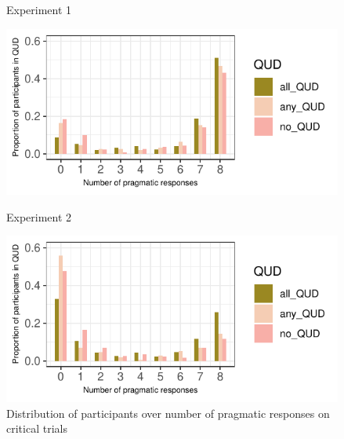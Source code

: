 \documentclass[12pt]{article}
\begin{document}
\begin{figure}[!ht] 
    \begin{minipage}{.5\textwidth}
    \caption*{Experiment 1}
    \includegraphics[height=5.6cm]{img/exp1_pragmatic_proportion.pdf}
    \end{minipage}%
    \begin{minipage}{.5\textwidth}
    \caption*{Experiment 2}
    \includegraphics[height=5.6cm]{img/exp2_pragmatic_proportion.pdf}
    \end{minipage}%
    \caption{Distribution of participants over number of pragmatic responses on critical trials}
\end{figure}
\end{document}
